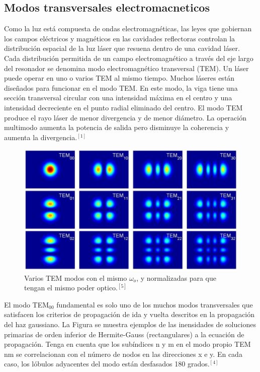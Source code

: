 \documentclass[11pt,letterpaper,twocolumn]{article}
\begin{document}
\subsection*{Modos transversales electromacneticos}
Como la luz está compuesta de ondas electromagnéticas, las leyes que gobiernan los campos eléctricos y magnéticos en las cavidades reflectoras controlan la distribución espacial de la luz láser que resuena dentro de una cavidad láser. Cada distribución permitida de un campo electromagnético a través del eje largo del resonador se denomina modo electromagnético transversal (TEM). Un láser puede operar en uno o varios TEM al mismo tiempo. Muchos láseres están diseñados para funcionar en el modo TEM. En este modo, la viga tiene una sección transversal circular con una intensidad máxima en el centro y una intensidad decreciente en el punto radial eliminado del centro. El modo TEM produce el rayo láser de menor divergencia y de menor diámetro. La operación multimodo aumenta la potencia de salida pero disminuye la coherencia y aumenta la divergencia.$^{[1]}$\\
\begin{figure}[h!]
\begin{center}
\includegraphics[scale=0.25]{tem.png}
\caption{Varios TEM modos con el mismo $\omega_{o}$, y normalizadas para que tengan el mismo poder optico.$^{[5]}$}
\end{center}
\end{figure}
\par 
El modo TEM$_{00}$ fundamental es solo uno de los muchos modos transversales que satisfacen los criterios de propagación de ida y vuelta descritos en la propagación del haz gaussiano. La Figura se muestra ejemplos de las inensidades de soluciones primarias de orden inferior de Hermite-Gauss (rectangulares) a la ecuación de propagación. Tenga en cuenta que los subíndices n y m en el modo propio TEM nm se correlacionan con el número de nodos en las direcciones x e y. En cada caso, los lóbulos adyacentes del modo están desfasados 180 grados.$^{[4]}$
\end{document}

